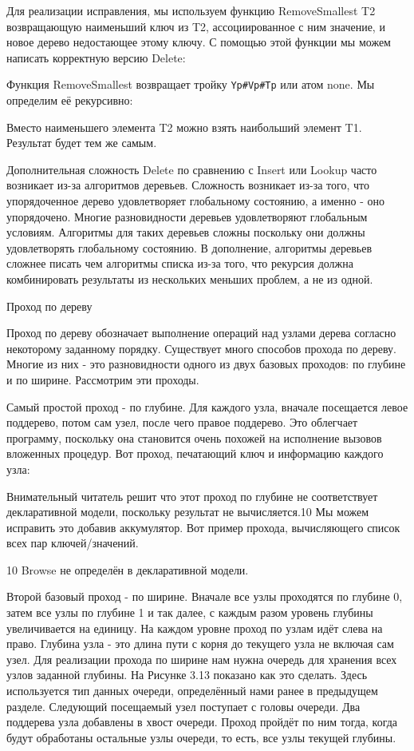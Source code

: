 Для реализации исправления, мы используем функцию {RemoveSmallest T2} возвращающую наименьший ключ из T2, ассоциированное с ним значение, и новое дерево недостающее этому ключу. С помощью этой функции мы можем написать корректную версию Delete:

Функция RemoveSmallest возвращает тройку \verb|Yp#Vp#Tp| или атом none. Мы определим её рекурсивно:

Вместо наименьшего элемента T2 можно взять наибольший элемент T1. Результат будет тем же самым.

Дополнительная сложность Delete по сравнению с Insert или Lookup часто возникает из-за алгоритмов деревьев. Сложность возникает из-за того, что упорядоченное дерево удовлетворяет глобальному состоянию, а именно - оно упорядочено. Многие разновидности деревьев удовлетворяют глобальным условиям. Алгоритмы для таких деревьев сложны поскольку они должны удовлетворять глобальному состоянию. В дополнение, алгоритмы деревьев сложнее писать чем алгоритмы списка из-за того, что рекурсия должна комбинировать результаты из нескольких меньших проблем, а не из одной.

Проход по дереву

Проход по дереву обозначает выполнение операций над узлами дерева согласно некоторому заданному порядку. Существует много способов прохода по дереву. Многие из них - это разновидности одного из двух базовых проходов: по глубине и по ширине. Рассмотрим эти проходы.

Самый простой проход - по глубине. Для каждого узла, вначале посещается левое поддерево, потом сам узел, после чего правое поддерево. Это облегчает программу, поскольку она становится очень похожей на исполнение вызовов вложенных процедур. Вот проход, печатающий ключ и информацию каждого узла:

Внимательный читатель решит что этот проход по глубине не соответствует декларативной модели, поскольку результат не вычисляется.10 Мы можем исправить это добавив аккумулятор. Вот пример прохода, вычисляющего список всех пар ключей/значений.

10 Browse не определён в декларативной модели.

Второй базовый проход - по ширине. Вначале все узлы проходятся по глубине 0, затем все узлы по глубине 1 и так далее, с каждым разом уровень глубины увеличивается на единицу. На каждом уровне проход по узлам идёт слева на право. Глубина узла - это длина пути с корня до текущего узла не включая сам узел. Для реализации прохода по ширине нам нужна очередь для хранения всех узлов заданной глубины. На Рисунке 3.13 показано как это сделать. Здесь используется тип данных очереди, определённый нами ранее в предыдущем разделе. Следующий посещаемый узел поступает с головы очереди. Два поддерева узла добавлены в хвост очереди. Проход пройдёт по ним тогда, когда будут обработаны остальные узлы очереди, то есть, все узлы текущей глубины.

